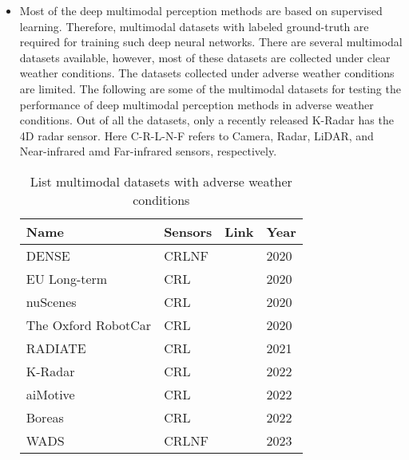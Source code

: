 \documentclass[rnd]{mas_proposal}
\begin{document}
\begin{itemize}
    \item Most of the deep multimodal perception methods are based on supervised learning. Therefore, multimodal datasets with labeled ground-truth are required for training such deep neural networks. There are several multimodal datasets available, however, most of these datasets are collected under clear weather conditions. The datasets collected under adverse weather conditions are limited. The following are some of the multimodal datasets for testing the performance of deep multimodal perception methods in adverse weather conditions. Out of all the datasets, only a recently released K-Radar \cite{paek2022k} has the 4D radar sensor. Here C-R-L-N-F refers to Camera, Radar, LiDAR, and Near-infrared amd Far-infrared sensors, respectively.


    \begin{table}[h]
        \centering
        \caption{List multimodal datasets with adverse weather conditions}
        \label{tab:my-table}
        \begin{tabular}{|l|l|l|l|}
        \hline
        \textbf{Name}       & \textbf{Sensors} & \textbf{Link} & \textbf{Year} \\ \hline
        DENSE               & CRLNF            & \cite{bijelic2020seeing}          & 2020          \\ \hline
        EU Long-term        & CRL              & \cite{yan2020eu}          & 2020          \\ \hline
        nuScenes            & CRL              & \cite{caesar2020nuscenes}          & 2020          \\ \hline
        The Oxford RobotCar & CRL              & \cite{barnes2020oxford}          & 2020          \\ \hline
        RADIATE             & CRL              & \cite{sheeny2021radiate}          & 2021          \\ \hline
        K-Radar             & CRL              & \cite{paek2022k}          & 2022          \\ \hline
        aiMotive            & CRL              & \cite{matuszka2022aimotive}          & 2022          \\ \hline
        Boreas              & CRL              & \cite{burnett2022boreas}          & 2022          \\ \hline
        WADS                & CRLNF            & \cite{kurup2022winter}          & 2023          \\ \hline
        \end{tabular}
    \end{table}
    

\end{itemize}
\end{document}

